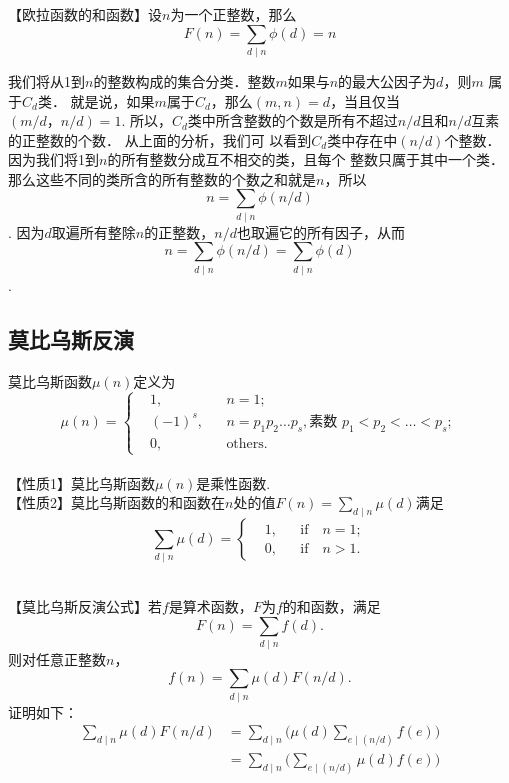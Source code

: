 \clearpage
    【欧拉函数的和函数】设$n$为一个正整数，那么\[F(n) = \sum_{d\mid n}\phi(d)=n\]

    我们将从1到$n$的整数构成的集合分类．整数$m$如果与$n$的最大公因子为$d$，则$m$
    属于$C_d$类． 就是说，如果$m$属于$C_d$，那么$(m,n)=d$，当且仅当$(m/d，n/d)=1$.
    所以，$C_d$类中所含整数的个数是所有不超过$n/d$且和$n/d$互素的正整数的个数． 从上面的分析，我们可
    以看到$C_d$类中存在中$(n/d)$个整数．因为我们将1到$n$的所有整数分成互不相交的类，且每个
    整数只厲于其中一个类． 那么这些不同的类所含的所有整数的个数之和就是$n$，所以
    \[n = \sum_{d\mid n}\phi(n/d)\].
    因为$d$取遍所有整除$n$的正整数，$n/d$也取遍它的所有因子，从而
    \[n = \sum_{d\mid n}\phi(n/d)= \sum_{d\mid n}\phi(d)\].

    \subsection{莫比乌斯反演}
        莫比乌斯函数$\mu(n)$定义为
        \[\mu(n)=
        \left\{\begin{aligned}
            &1,&& n=1; \\
            &(-1)^s, &&n=p_1p_2\ldots p_s,\text{素数 }p_1<p_2<\ldots <p_s;\\
            &0, && \text{others}.
        \end{aligned}\right.
        \]\\
\vspace{2em}
        【性质1】莫比乌斯函数$\mu(n)$是乘性函数.\\
\vspace{2em}
        【性质2】莫比乌斯函数的和函数在$n$处的值$F(n)=\sum \limits_{d\mid n} \mu(d)$满足
        \[
            \sum \limits_{d\mid n} \mu(d)=
            \left\{\begin{aligned}
                &1,&& \text{if}\quad n=1; \\
                &0, && \text{if}\quad n>1.
            \end{aligned}\right.
        \]\\
        \vspace{3em}

        【莫比乌斯反演公式】若$f$是算术函数，$F$为$f$的和函数，满足
        \[F(n) = \sum_{d\mid n}f(d).\]
        则对任意正整数$n$，
        \[f(n) = \sum_{d\mid n}\mu(d)F(n/d).\]
        证明如下：
        \[
            \begin{aligned} 
                \sum_{d\mid n}\mu(d)F(n/d)&=\sum_{d\mid n}\biggl(\mu(d)\sum_{e\mid (n/d)}f(e)\biggr)\\
                                          &=\sum_{d\mid n}\biggl(\sum_{e\mid (n/d)}\mu(d)f(e)\biggr)\\
            \end{aligned}            
        \]

